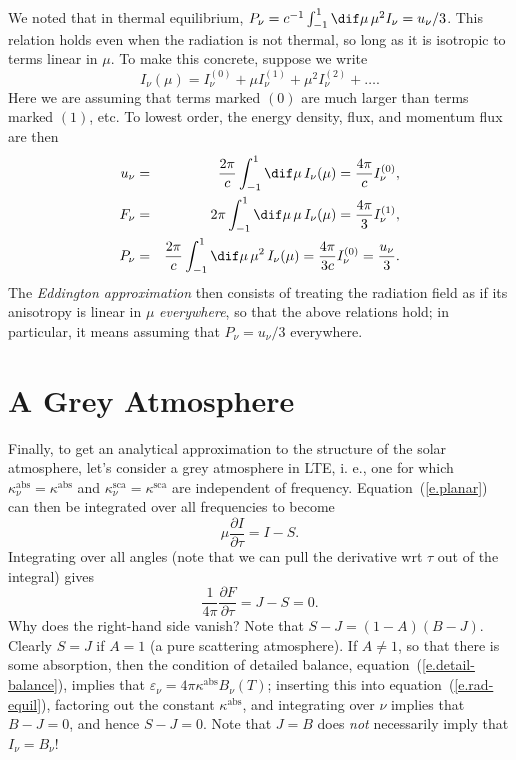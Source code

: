 We noted that in thermal equilibrium, $P_{\nu} = c^{-1}\int_{-1}^{1}\dif\mu\,\mu^{2}I_{\nu} = u_{\nu}/3$. This relation holds even when the radiation is not thermal, so long as it is isotropic to terms linear in $\mu$.  To make this concrete, suppose we write
\[ I_{\nu}(\mu) = I_{\nu}^{(0)} + \mu I_{\nu}^{(1)} + \mu^{2}I_{\nu}^{(2)} + \ldots. \]
Here we are assuming that terms marked $(0)$ are much larger than terms marked $(1)$, etc.  To lowest order, the energy density, flux, and momentum flux are then
\begin{eqnarray*}
u_{\nu} &=& \frac{2\pi}{c}\int_{-1}^{1}\dif\mu\,I_{\nu}(\mu) = \frac{4\pi}{c} I_{\nu}^{(0)},\\
F_{\nu} &=& 2\pi\int_{-1}^{1}\dif\mu\,\mu\,I_{\nu}(\mu) = \frac{4\pi}{3} I_{\nu}^{(1)},\\
P_{\nu} &=& \frac{2\pi}{c}\int_{-1}^{1}\dif\mu\,\mu^{2}\,I_{\nu}(\mu) = \frac{4\pi}{3c}I_{\nu}^{(0)} = \frac{u_{\nu}}{3}.
\end{eqnarray*}
The \emph{Eddington approximation} then consists of treating the radiation field as if its anisotropy is linear in $\mu$ \emph{everywhere}, so that the above relations hold; in particular, it means assuming that $P_{\nu} = u_{\nu}/3$ everywhere.

\section[Grey Atmosphere]{A Grey Atmosphere}

Finally, to get an analytical approximation to the structure of the solar atmosphere, let's consider a grey atmosphere in LTE, i. e., one for which $\kappa_{\nu}^{\mathrm{abs}} = \kappa^{\mathrm{abs}}$ and $\kappa_{\nu}^{\mathrm{sca}} = \kappa^{\mathrm{sca}}$ are independent of frequency. Equation~(\ref{e.planar}) can then be integrated over all frequencies to become
\begin{equation}\label{e.J-grey}
\mu\frac{\partial I}{\partial\tau} = I-S.
\end{equation}
Integrating over all angles (note that we can pull the derivative wrt $\tau$ out of the integral) gives
\begin{equation}\label{e.H-grey}
\frac{1}{4\pi}\frac{\partial F}{\partial\tau} = J - S = 0.
\end{equation}
Why does the right-hand side vanish? Note that $S-J = (1-A)(B-J)$.  Clearly $S = J$ if $A = 1$ (a pure scattering atmosphere).  If $A \ne 1$, so that there is some absorption, then the condition of detailed balance, equation~(\ref{e.detail-balance}), implies that $\varepsilon_{\nu} = 4\pi\kappa^{\mathrm{abs}}B_{\nu}(T)$; inserting this into equation~(\ref{e.rad-equil}), factoring out the constant $\kappa^{\mathrm{abs}}$, and integrating over $\nu$ implies that $B - J = 0$, and hence $S - J = 0$. Note that $J = B$ does \emph{not} necessarily imply that $I_{\nu} = B_{\nu}$!

